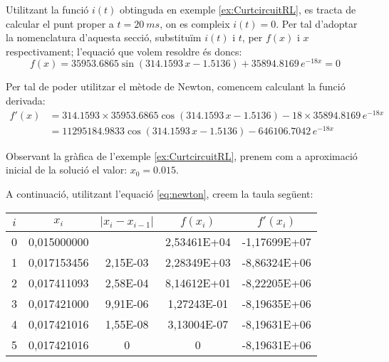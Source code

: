 \begin{exemple}\label{ex:SolFunNoLin}
	\addcontentsxms{\SolFunNoLin}	
    Utilitzant la funció $i(t)$ obtinguda en exemple \vref{ex:CurtcircuitRL}, es tracta de calcular el punt proper a $t = \qty{20}{ms}$, on es compleix $i(t)=0$. Per tal d'adoptar la nomenclatura d'aquesta secció, substituïm $i(t)$ i $t$, per $f(x)$ i $x$ respectivament; l'equació que volem resoldre és doncs:
    \[
        f(x) = \num{35953,6865}\sin(\num{314,1593}\,x-\num{1,5136}) + \num{35894,8169}\,e^{-18 x} = 0
    \]

    Per tal de poder utilitzar el mètode de Newton, comencem calculant la funció derivada:
    \begin{align*}
        f'(x) &= \num{314,1593}\times\num{35953,6865}\cos(\num{314,1593}\,x-\num{1,5136}) -18\times \num{35894,8169}\,e^{-18 x} \\
        {} &= \num{11295184,9833}\cos(\num{314,1593}\,x-\num{1,5136}) - \num{646106,7042}\,e^{-18 x}
    \end{align*}

    Observant la gràfica de l'exemple \vref{ex:CurtcircuitRL}, prenem com a  aproximació inicial de la solució el valor: $x_0 = \num{0,015}$.

    A continuació, utilitzant l'equació \eqref{eq:newton}, creem la taula següent:

\begin{center}
   \centering
   \begin{tabular}{S[table-format=1.0]S[table-format=2.9]S[table-format=2.2e+2]
   S[table-format=2.5e+2]S[table-format=+3.5e+2]}
    & {$x_i$}  & {$|x_i - x_{i-1}|$} & {$f(x_i)$} & {$f'(x_i)$} \\
    &	0,015000000 &	{}       & 2,53461E+04	& -1,17699E+07 \\
        1 &	0,017153456 &	2,15E-03 & 2,28349E+03	& -8,86324E+06 \\	
        2 &	0,017411093 &	2,58E-04 & 8,14612E+01	& -8,22205E+06 \\	
        3 &	0,017421000 &	9,91E-06 & 1,27243E-01	& -8,19635E+06 \\	
        4 &	0,017421016 &	1,55E-08 & 3,13004E-07	& -8,19631E+06 \\	
        5 &	0,017421016 &	0        & 0           	& -8,19631E+06 \\	
   \bottomrule[1pt]
   \end{tabular}
\end{center}


\end{exemple}

